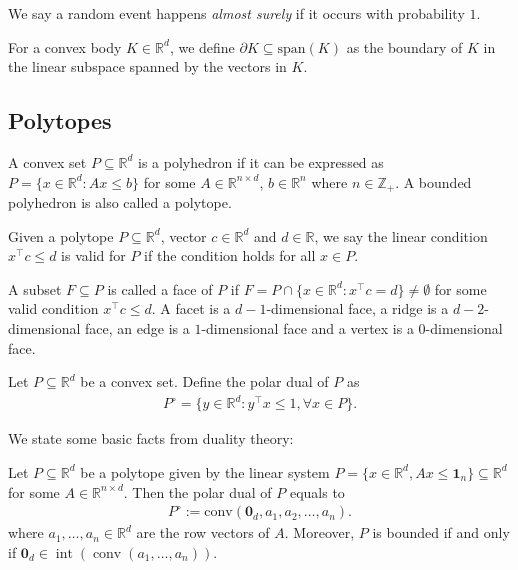 \documentclass{article}\usepackage[a4paper,margin=20mm]{geometry}
\newcommand{\R}{\mathbb R}
\newcommand{\conv}{\operatorname{conv}}
\renewcommand{\subset}{\subseteq}
\begin{document}
We say a random event happens \emph{almost surely} if it occurs with probability $1$.

For a convex body $K \in \R^d$,  we define $\partial K \subset \mathrm{span}(K)$ as the boundary of $K$ in the linear subspace spanned by the vectors in $K$.


\subsection{Polytopes}

\begin{definition}[Polytope]
    A convex set $P \subset \mathbb{R}^d$ is a polyhedron if it can be expressed as $P = \{x \in \mathbb{R}^d : A x \leq b\}$ for some $A \in \mathbb{R}^{n \times d}$, $b \in \mathbb{R}^n$ where $n \in \mathbb{Z}_+$.
    A bounded polyhedron is also called a polytope.
\end{definition}

\begin{definition}
    Given a polytope $P \subset \R^d$, vector $c\in \R^d$ and $d\in \R$, we say the linear condition $x^\top c \leq d$ is valid for $P$ if  the condition holds for all $x\in P$.
    
    A subset $F \subset P$ is called a face of $P$ if $F = P \cap \{x\in \R^d : x^\top c = d\} \neq \emptyset$ for some valid condition $x^\top c \leq d$.
    A facet is a $d-1$-dimensional face, a ridge is a $d-2$-dimensional face, an edge is a $1$-dimensional face and a vertex is a $0$-dimensional face.
\end{definition}

\begin{definition}\label{def:smooth_polar}
    Let $P \subset \R^d$ be a convex set. Define the polar dual of $P$ as 
    \begin{align*}
        P^\circ = \{y \in \R^d : y^\top x \leq 1, \forall x \in P\}.
    \end{align*}
\end{definition}

We state some basic facts from duality theory:
\begin{fact}
    Let $P \subset \R^d$ be a polytope given by the linear system $P=\{x\in \mathbb{R}^d, A x \le \mathbf{1}_n\} \subset \R^d$ for some $A\in \R^{n\times d}$. Then the polar dual of $P$ equals to
    \begin{align*}
        P^\circ := \mathrm{conv}(\mathbf{0}_d,a_1,a_2,\ldots,a_n).
    \end{align*}
    where $a_1, \ldots, a_n \in \R^d$ are the row vectors of $A$.
    Moreover, $P$ is bounded if and only if $\mathbf{0}_d \in \operatorname{int}(\conv(a_1, \ldots, a_n))$.
\end{fact}
\end{document}
